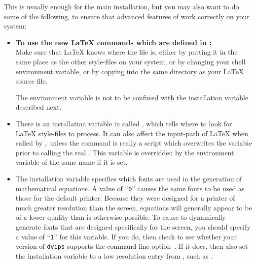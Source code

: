 \medskip\htmlrule[50\% center]
\noindent
This is usually enough for the main installation, but you may also
want to do some of the following, to ensure that advanced features
of \latextohtml{} work correctly on your system:
\begin{itemize}
%
%
\item
\textbf{To use the new \LaTeX{}  commands
which are defined in :}\\
Make sure that \LaTeX{}  knows where the  file is,
either by putting it in the same place as the other style-files on your system,
or by changing your  shell environment variable,
or by copying  into the same directory as your \LaTeX{}  source file.

The environment variable  is not to be confused with
the \latextohtml{} installation variable  described next.
\par

%
\item
There is an installation variable in 
called ,
which tells \latextohtml{} where to look for \LaTeX{} style-files to process.
It can also affect the input-path of \LaTeX{} when called by \latextohtml,
unless the command  is really a script
which overwrites the  variable
prior to calling the real .
This variable is overridden by the environment variable of the same name
if it is set.

%
\item
The installation variable  specifies which
fonts are used in the generation of mathematical equations.  A value
of ``\texttt{0}'' causes the same fonts to be used as those for the default
printer.  Because they were designed for a printer of much greater
resolution than the screen, equations will generally appear to be
of a lower quality than is otherwise possible.  To cause \latextohtml{} to
dynamically generate fonts that are designed specifically for the
screen, you should specify a value of ``\texttt{1}'' for this variable.
If you do, then check to see whether your version of \texttt{dvips}
supports the command-line option \,.  If it does,
then also set the installation variable  to
a low resolution entry from , such as .


\end{itemize}

